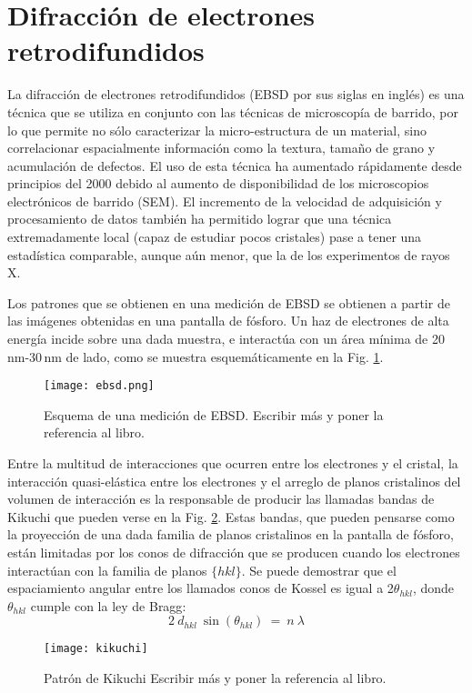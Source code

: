  \section{Difracción de electrones retrodifundidos}\label{S:EBSD}
La difracción de electrones retrodifundidos (EBSD por sus siglas en inglés) es una técnica que se utiliza en conjunto con las técnicas de microscopía de barrido, por lo que permite no sólo caracterizar la micro-estructura de un material, sino correlacionar espacialmente información como la textura, tamaño de grano y acumulación de defectos.
El uso de esta técnica ha aumentado rápidamente desde principios del 2000 debido al aumento de disponibilidad de los microscopios electrónicos de barrido (SEM). El incremento de la velocidad de adquisición y procesamiento de datos también ha permitido lograr que una técnica extremadamente local (capaz de estudiar pocos cristales) pase a tener una estadística comparable, aunque aún menor, que la de los experimentos de rayos X.


Los patrones que se obtienen en una medición de EBSD se obtienen a partir de las imágenes obtenidas en una pantalla de fósforo. Un haz de electrones de alta energía incide sobre una dada muestra, e interactúa con un área mínima de 20\,nm-30\,nm de lado, como se muestra esquemáticamente en la Fig. \ref{fig:ebsd}.

\begin{figure}[!htb]
  \centering
  \texttt{[image: ebsd.png]}
  \caption{Esquema de una medición de EBSD. Escribir más y poner la referencia al libro.}
  \label{fig:ebsd}
\end{figure}

Entre la multitud de interacciones que ocurren entre los electrones y el cristal, la interacción quasi-elástica entre los electrones y el arreglo de planos cristalinos del volumen de interacción es la responsable de producir las llamadas bandas de Kikuchi que pueden verse en la Fig. \ref{fig:kikuchi}.
Estas bandas, que pueden pensarse como la proyección de una dada familia de planos cristalinos en la pantalla de fósforo, están limitadas por los conos de difracción que se producen cuando los electrones interactúan con la familia de planos $\{ hkl \}$. 
Se puede demostrar que el espaciamiento angular entre los llamados conos de Kossel es igual a 2$\theta_{hkl}$, donde $\theta_{hkl}$ cumple con la ley de Bragg\cite{schwartz2010electron}:
\begin{equation}
  2 \ d_{hkl} \ \sin(\theta_{hkl}) \ = \ n \ \lambda
  \label{eq:BraggEBSD}
\end{equation}
\noindent
\begin{figure}[!htb]
  \centering
  \texttt{[image: kikuchi]}
  \caption{Patrón de Kikuchi Escribir más y poner la referencia al libro.}
  \label{fig:kikuchi}
 \end{figure}

